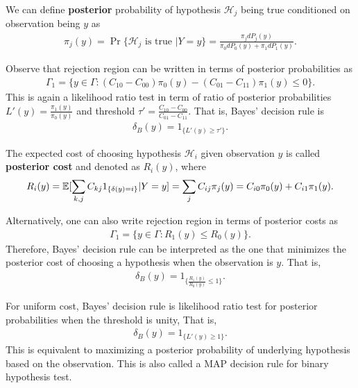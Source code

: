 \documentclass[a4paper,english,12pt]{article}
\begin{document}
\begin{defn} We can define \textbf{posterior} probability of hypothesis $\mathcal{H}_j$ being true conditioned on observation being $y$ as
\begin{align*} 
\pi_j(y) = \Pr\{ \mathcal{H}_j \text{ is true } | Y = y \} = \frac{\pi_j dP_j(y)}{\pi_0dP_0(y) + \pi_1dP_1(y)}.
\end{align*}
\end{defn}
\begin{rem}
Observe that rejection region can be written in terms of posterior probabilities as
\begin{align*}
\Gamma_1 = \{ y \in \Gamma: (C_{10}-C_{00})\pi_0(y) - (C_{01}-C_{11})\pi_1(y) \leq 0 \}.
\end{align*}
This is again a likelihood ratio test in term of ratio of posterior probabilities $L'(y) = \frac{\pi_1(y)}{\pi_0(y)}$ and threshold $\tau' = \frac{C_{10}-C_{00}}{C_{01}-C_{11}}$. That is, Bayes' decision rule is
\begin{align*}
\delta_B(y) = 1_{\{ L'(y) \geq \tau'\}}.
\end{align*}
\end{rem}
\begin{defn}
The expected cost of choosing hypothesis $\mathcal{H}_i$ given observation $y$ is called \textbf{posterior cost} and denoted as $R_i(y)$, where %
\begin{align*}
R_i(y) = \mathbb{E}[\sum_{k,j}C_{kj}1_{\{\delta(y)=i\}}|Y = y] = \sum_{j}C_{ij}\pi_j(y) = C_{i0}\pi_0(y) + C_{i1}\pi_1(y).
\end{align*}
\end{defn}
\begin{rem}
Alternatively, one can also write rejection region in terms of posterior costs as 
\begin{align*}
\Gamma_1 =  \{ y \in \Gamma: R_1(y) \leq R_0(y)\}.
\end{align*}
 Therefore, Bayes' decision rule can be interpreted as the one that minimizes the posterior cost of choosing a hypothesis when the observation is $y$. 
 That is, 
\begin{align*}
\delta_B(y) = 1_{\{ \frac{R_1(y)}{R_0(y)} \leq 1 \}}.
\end{align*}
\end{rem}
\begin{rem}
For uniform cost, Bayes' decision rule is likelihood ratio test for posterior probabilities when the threshold is unity, That is,
\begin{align*}
\delta_B(y) = 1_{\{ L'(y) \geq 1 \}}.
\end{align*}
This is equivalent to maximizing a posterior probability of underlying hypothesis based on the observation. This is also called a MAP decision rule for binary hypothesis test.
\end{rem}
\end{document}

